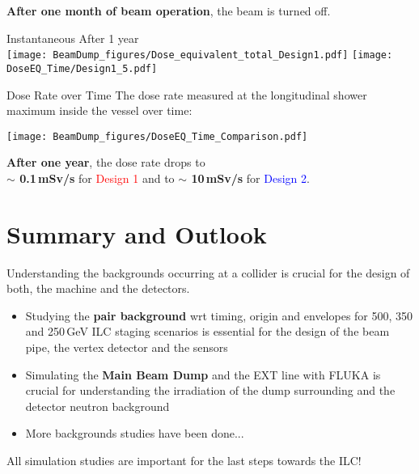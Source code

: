 \documentclass[xcolor={dvipsnames}]{beamer}
\begin{document}
\begin{frame}
\textbf{After one month of beam operation}, the beam is turned off.\\
  \begin{center}
    \hspace*{1.4cm} Instantaneous \hfill After 1 year\hspace*{2cm} \\
  \texttt{[image: BeamDump\_figures/Dose\_equivalent\_total\_Design1.pdf]}
  \texttt{[image: DoseEQ\_Time/Design1\_5.pdf]}
 \end{center}
\end{frame}
\begin{frame}{Dose Rate over Time}
The dose rate measured at the longitudinal shower maximum inside the vessel over time:
\begin{center}
  \texttt{[image: BeamDump\_figures/DoseEQ\_Time\_Comparison.pdf]}
\end{center}
\textbf{After one year}, the dose rate drops to \\\textbf{$\sim$ 0.1\,mSv/s} for \textcolor{Red}{Design 1} and to \textbf{$\sim$ 10\,mSv/s} for \textcolor{Blue}{Design 2}.
\end{frame}

\section{Summary and Outlook}
\begin{frame}
Understanding the backgrounds occurring at a collider is crucial for the design of both, the machine and the detectors.
\vspace*{0.2cm}
 \begin{itemize} 
  \item Studying the \textbf{pair background} wrt timing, origin and envelopes for 500, 350 and 250\,GeV ILC staging scenarios is \alert{essential for the design of the beam pipe, the vertex detector and the sensors}
  \item Simulating the \textbf{Main Beam Dump} and the EXT line with FLUKA is \alert{crucial for understanding the irradiation of the dump surrounding and the detector neutron background}
  \item More backgrounds studies have been done...
 \end{itemize}
\vspace*{0.5cm}
\alert{All simulation studies are important for the last steps towards the ILC!}
\end{frame}
\end{document}
